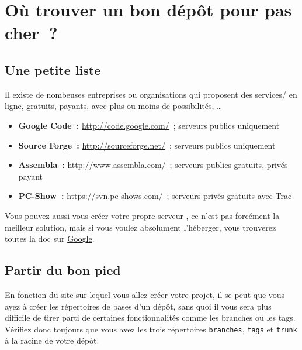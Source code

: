 \chapter{Où trouver un bon dépôt pour pas cher~?}

\section{Une petite liste}

Il existe de nombeuses entreprises ou organisations qui proposent des services/\svn{} en ligne, gratuits, payants, avec plus ou moins de possibilités, \ldots\\

\begin{itemize}
  \item \textbf{Google Code~:} \url{http://code.google.com/}~; serveurs publics uniquement
  \item \textbf{Source Forge~:} \url{http://sourceforge.net/}~; serveurs publics uniquement
  \item \textbf{Assembla~:} \url{http://www.assembla.com/}~; serveurs publics gratuits, privés payant
  \item \textbf{PC-Show~:} \url{https://svn.pc-shows.com/}~; serveurs privés gratuits avec Trac
\end{itemize}

Vous pouvez aussi vous créer votre propre serveur \svn, ce n'est pas forcément la meilleur solution, mais si vous voulez absolument l'héberger, vous trouverez toutes la doc sur \href{http://www.google.com/}{Google}.

\section{Partir du bon pied}

En fonction du site sur lequel vous allez créer votre projet, il se peut que vous ayez à créer les répertoires de bases d'un dépôt, sans quoi il vous sera plus difficile de tirer parti de certaines fonctionnalités comme les branches ou les tags.\\

Vérifiez donc toujours que vous avez les trois répertoires \texttt{branches}, \texttt{tags} et \texttt{trunk} à la racine de votre dépôt.